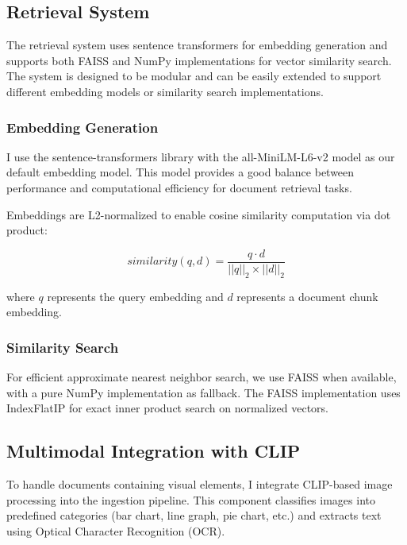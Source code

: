 \documentclass[11pt,a4paper]{article}
\begin{document}
\subsection{Retrieval System}

The retrieval system uses sentence transformers for embedding generation and supports both FAISS and NumPy implementations for vector similarity search. The system is designed to be modular and can be easily extended to support different embedding models or similarity search implementations.

\subsubsection{Embedding Generation}

I use the sentence-transformers library with the all-MiniLM-L6-v2 model as our default embedding model. This model provides a good balance between performance and computational efficiency for document retrieval tasks.

Embeddings are L2-normalized to enable cosine similarity computation via dot product:

\begin{equation}
similarity(q, d) = \frac{q \cdot d}{||q||_2 \times ||d||_2}
\end{equation}

where $q$ represents the query embedding and $d$ represents a document chunk embedding.

\subsubsection{Similarity Search}

For efficient approximate nearest neighbor search, we use FAISS when available, with a pure NumPy implementation as fallback. The FAISS implementation uses IndexFlatIP for exact inner product search on normalized vectors.

\subsection{Multimodal Integration with CLIP}

To handle documents containing visual elements, I integrate CLIP-based image processing into the ingestion pipeline. This component classifies images into predefined categories (bar chart, line graph, pie chart, etc.) and extracts text using Optical Character Recognition (OCR).
\end{document}
